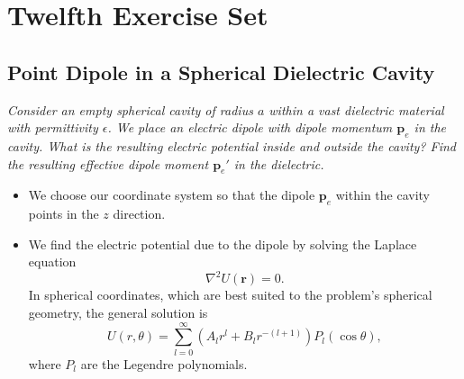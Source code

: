 \documentclass[11pt, a4paper]{article}
\renewcommand{\vec}[1]{\bm{#1}} %
\renewcommand{\r}{\vec{r}}
\newcommand{\e}{\epsilon}
\newcommand{\pe}{\vec{p}_{e}}  %
\renewcommand{\laplacian}{\nabla^{2}}
\begin{document}
\section{Twelfth Exercise Set}
\subsection{Point Dipole in a Spherical Dielectric Cavity}
\textit{Consider an empty spherical cavity of radius $ a $ within a vast dielectric material with permittivity $ \e $. We place an electric dipole with dipole momentum $ \pe $ in the cavity. What is the resulting electric potential inside and outside the cavity? Find the resulting effective dipole moment $ \pe' $ in the dielectric.}
\begin{itemize}
	\item  We choose our coordinate system so that the dipole $ \pe $ within the cavity points in the $ z $ direction.
	
	
	\item We find the electric potential due to the dipole by solving the Laplace equation 
	\begin{equation*}
		\laplacian U(\r) = 0.
	\end{equation*}
	In spherical coordinates, which are best suited to the problem's spherical geometry, the general solution is
	\begin{equation*}
		U(r, \theta) = \sum_{l = 0}^{\infty}(A_{l}r^{l} + B_{l}r^{-(l+1)})P_{l}(\cos \theta),
	\end{equation*}
	where $ P_{l} $ are the Legendre polynomials.
	

\end{itemize}
\end{document}
